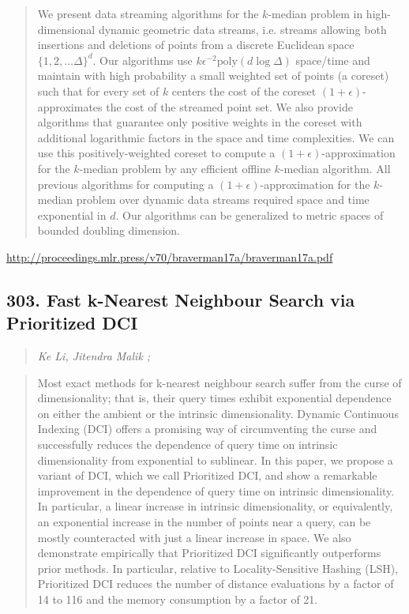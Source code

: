 \documentclass{article}
\begin{document}
\begin{quote}
    We present data streaming algorithms for the $k$-median problem in high-dimensional dynamic geometric data streams, i.e. streams allowing both insertions and deletions of points from a discrete Euclidean space $\{1, 2, \ldots \Delta\}^d$. Our algorithms use $k \epsilon^{-2} \mathrm{poly}(d \log \Delta)$ space/time and maintain with high probability a small weighted set of points (a coreset) such that for every set of $k$ centers the cost of the coreset $(1+\epsilon)$-approximates the cost of the streamed point set. We also provide algorithms that guarantee only positive weights in the coreset with additional logarithmic factors in the space and time complexities. We can use this positively-weighted coreset to compute a $(1+\epsilon)$-approximation for the $k$-median problem by any efficient offline $k$-median algorithm. All previous algorithms for computing a $(1+\epsilon)$-approximation for the $k$-median problem over dynamic data streams required space and time exponential in $d$. Our algorithms can be generalized to metric spaces of bounded doubling dimension.  
\end{quote}

\href{http://proceedings.mlr.press/v70/braverman17a/braverman17a.pdf}{http://proceedings.mlr.press/v70/braverman17a/braverman17a.pdf}

\subsection{303. Fast k-Nearest Neighbour Search via Prioritized DCI}

\begin{quote}
\footnotesize{\textit{Ke Li, Jitendra Malik ;}}

\end{quote}

\begin{quote}
    Most exact methods for k-nearest neighbour search suffer from the curse of dimensionality; that is, their query times exhibit exponential dependence on either the ambient or the intrinsic dimensionality. Dynamic Continuous Indexing (DCI) offers a promising way of circumventing the curse and successfully reduces the dependence of query time on intrinsic dimensionality from exponential to sublinear. In this paper, we propose a variant of DCI, which we call Prioritized DCI, and show a remarkable improvement in the dependence of query time on intrinsic dimensionality. In particular, a linear increase in intrinsic dimensionality, or equivalently, an exponential increase in the number of points near a query, can be mostly counteracted with just a linear increase in space. We also demonstrate empirically that Prioritized DCI significantly outperforms prior methods. In particular, relative to Locality-Sensitive Hashing (LSH), Prioritized DCI reduces the number of distance evaluations by a factor of 14 to 116 and the memory consumption by a factor of 21.  
\end{quote}
\end{document}

